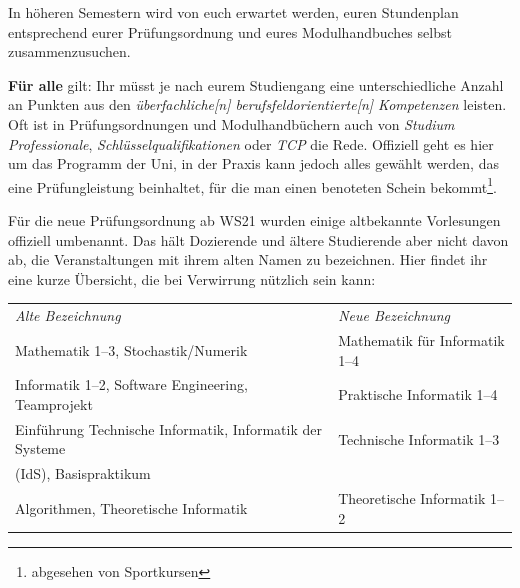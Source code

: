 In höheren Semestern wird von euch erwartet werden, euren Stundenplan
entsprechend eurer Prüfungsordnung und eures Modulhandbuches selbst
zusammenzusuchen. %

\textbf{Für alle} gilt: Ihr müsst je nach eurem Studiengang eine
unterschiedliche Anzahl an Punkten aus den \emph{überfachliche[n]
berufsfeldorientierte[n] Kompetenzen} leisten. Oft ist in Prüfungsordnungen und
Modulhandbüchern auch von \emph{Studium Professionale},
\emph{Schlüsselqualifikationen} oder \emph{TCP} die Rede. Offiziell geht es
hier um das Programm der Uni, in der Praxis kann jedoch alles gewählt werden,
das eine Prüfungleistung beinhaltet, für die man einen benoteten Schein
bekommt\footnote{abgesehen von Sportkursen}.

%

Für die neue Prüfungsordnung ab WS21 wurden einige altbekannte Vorlesungen offiziell umbenannt.
Das hält Dozierende und ältere Studierende aber nicht davon ab, die Veranstaltungen mit
ihrem alten Namen zu bezeichnen. Hier findet ihr eine kurze Übersicht, die bei Verwirrung nützlich sein kann:

\begin{tabular}{ll}
\emph{Alte Bezeichnung}						& \emph{Neue Bezeichnung} \\[.4em]
Mathematik 1--3, Stochastik/Numerik	& Mathematik für Informatik 1--4 \\[.4em]
Informatik 1--2, Software Engineering, Teamprojekt & Praktische Informatik 1--4\\[.4em]
Einführung Technische Informatik, Informatik der Systeme & Technische Informatik 1--3\\
(IdS), Basispraktikum & \\[.4em]
Algorithmen, Theoretische Informatik	& Theoretische Informatik 1--2 \\[.4em]
\end{tabular}

